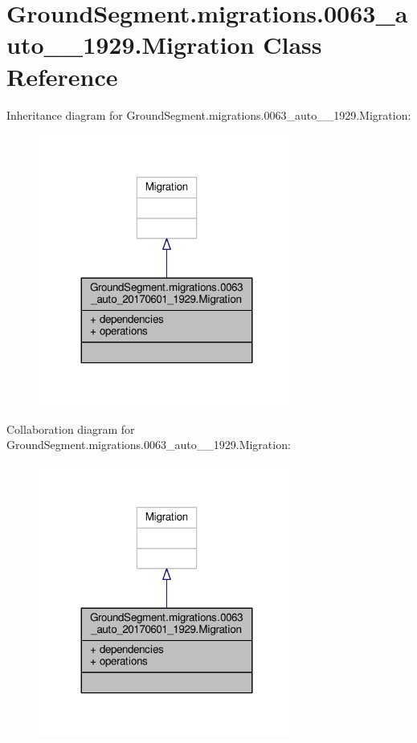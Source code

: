 \hypertarget{class_ground_segment_1_1migrations_1_10063__auto__20170601__1929_1_1_migration}{}\section{Ground\+Segment.\+migrations.0063\+\_\+auto\+\_\+\_\+1929.Migration Class Reference}
\label{class_ground_segment_1_1migrations_1_10063__auto__20170601__1929_1_1_migration}


Inheritance diagram for Ground\+Segment.\+migrations.0063\+\_\+auto\+\_\+\_\+1929.Migration\+:\nopagebreak
\begin{figure}[H]
\begin{center}
\leavevmode
\includegraphics[width=239pt]{class_ground_segment_1_1migrations_1_10063__auto__20170601__1929_1_1_migration__inherit__graph}
\end{center}
\end{figure}


Collaboration diagram for Ground\+Segment.\+migrations.0063\+\_\+auto\+\_\+\_\+1929.Migration\+:\nopagebreak
\begin{figure}[H]
\begin{center}
\leavevmode
\includegraphics[width=239pt]{class_ground_segment_1_1migrations_1_10063__auto__20170601__1929_1_1_migration__coll__graph}
\end{center}
\end{figure}
